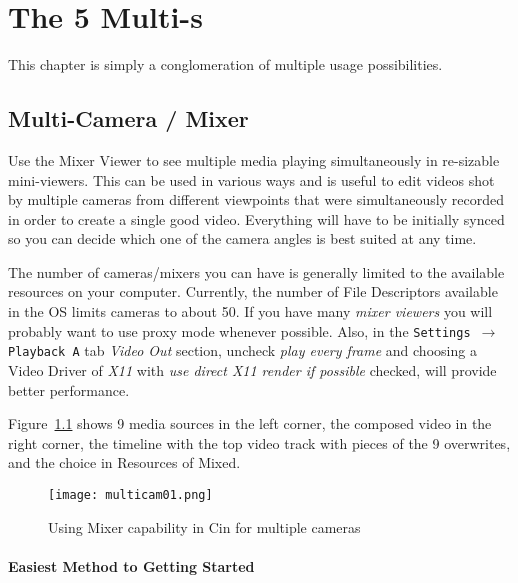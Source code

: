 \chapter{The 5 Multi-s}%
\label{cha:multi_5}

This chapter is simply a conglomeration of multiple usage possibilities.

\section{Multi-Camera / Mixer}%
\label{sec:multicamera_mixer}

Use the Mixer Viewer to see multiple media playing simultaneously in re-sizable mini-viewers.  This can be used in various ways and is useful to edit videos shot by multiple cameras from different viewpoints that were simultaneously recorded in order to create a single good video.  Everything will have to be initially synced so you can decide which one of the camera angles is best suited at any time. 

The number of cameras/mixers you can have is generally limited to the available resources on your computer.  Currently, the number of File Descriptors available in the OS limits cameras to about 50.  If you have many \textit{mixer viewers} you will probably want to use proxy mode whenever possible.  Also, in the \texttt{Settings $\rightarrow$ Playback A} tab \textit{Video Out} section, uncheck \textit{play every frame} and choosing a Video Driver of \textit{X11} with \textit{use direct X11 render if possible} checked, will provide better performance.

Figure~\ref{fig:multicam01} shows 9 media sources in the left corner, the composed video in the right corner, the timeline with the top video track with pieces of the 9 overwrites, and the choice in Resources of Mixed.

\begin{figure}[htpb]
    \centering
    \texttt{[image: multicam01.png]}
    \caption{Using Mixer capability in Cin for multiple cameras}
    \label{fig:multicam01}
\end{figure}

\subsubsection*{Easiest Method to Getting Started}%
\label{ssub:easiest_method_started}

